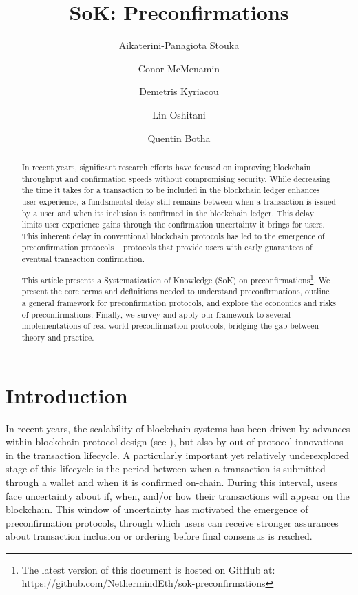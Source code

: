 \documentclass[a4paper]{article}
\title{SoK: Preconfirmations}
\author[1]{Aikaterini-Panagiota Stouka}
\author[1]{Conor McMenamin}
\author[3]{Demetris Kyriacou}
\author[1]{Lin Oshitani}
\author[2]{Quentin Botha}
\affil[1]{\small\textit{Nethermind Research}}
\affil[2]{\small\textit{Research Institute for Cryptoeconomics, WU Vienna}}
\affil[3]{\small\textit{Imperial College London}}
\theoremstyle{boldstyle}
\begin{document}
\maketitle

\begin{abstract}
 
In recent years, significant research efforts have focused on improving blockchain throughput and confirmation speeds without compromising security. While decreasing the time it takes for a transaction to be included in the blockchain ledger enhances user experience, a fundamental delay still remains between when a transaction is issued by a user and when its inclusion is confirmed in the blockchain ledger. This delay limits user experience gains through the confirmation uncertainty it brings for users. This inherent delay in conventional blockchain protocols has led to the emergence of preconfirmation protocols -- protocols that provide users with early guarantees of eventual transaction confirmation.

This article presents a Systematization of Knowledge (SoK) on preconfirmations\footnote{The latest version of this document is hosted on GitHub at: https://github.com/NethermindEth/sok-preconfirmations}. We present the core terms and definitions needed to understand preconfirmations, outline a general framework for preconfirmation protocols, and explore the economics and risks of preconfirmations. Finally, we survey and apply our framework to several implementations of real-world preconfirmation protocols, bridging the gap between theory and practice.
 
 
 

 
\end{abstract}





\setlength{\marginparwidth}{2cm} 

\section{Introduction}



In recent years, the scalability of blockchain systems has been driven by advances within blockchain protocol design (see \cite{cryptoeprint:2018/1119, che2025manifoldchain, Fitzi2020ProofofStakeBP, neiheiser2025anthemiusefficientmodular, ethereum_scaling}), but also by out-of-protocol innovations in the transaction lifecycle.
A particularly important yet relatively underexplored stage of this lifecycle is the period between when a transaction is submitted through a wallet and when it is confirmed on-chain. During this interval, users face uncertainty about if, when, and/or how their transactions will appear on the blockchain. This window of uncertainty has motivated the emergence of preconfirmation protocols, through which users can receive stronger assurances about transaction inclusion or ordering before final consensus is reached.
\end{document}
